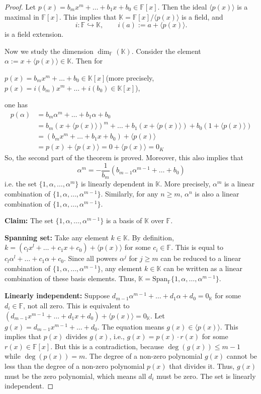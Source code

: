 \begin{proof}
Let $p(x) = b_mx^m + \dots + b_1 x + b_0 \in \mathbb{F}[x]$. Then the ideal $\langle p(x) \rangle$ is a maximal in $\mathbb{F}[x]$.
This implies that $\mathbb{K} = \mathbb{F}[x]/\langle p(x) \rangle$ is a field, and
$$i: \mathbb{F} \hookrightarrow \mathbb{K}, \quad \quad i(a) := a + \langle p(x) \rangle.$$
is a field extension.

Now we study the dimension $\dim_{\mathbb{F}}(\mathbb{K})$. Consider the element $\alpha := x + \langle p(x) \rangle \in \mathbb{K}$. Then for 
\begin{center}
$p(x) = b_m x^m + \dots  + b_0 \in \mathbb{K}[x]$\quad (more precisely, $p(x) = i(b_m) x^m + \dots + i(b_0) \in \mathbb{K}[x]$),
\end{center}
one has
\begin{align*}
p(\alpha) &= b_m \alpha^m + \dots + b_1 \alpha + b_0 \\
&= b_m(x+\langle p(x) \rangle)^m + \dots + b_1(x+\langle p(x) \rangle) + b_0(1+\langle p(x) \rangle) \\
&= (b_m x^m + \dots + b_1 x + b_0) + \langle p(x) \rangle \\
&= p(x) + \langle p(x) \rangle = 0 + \langle p(x) \rangle = 0_K
\end{align*}
So, the second part of the theorem is proved. Moreover, this also implies that 
\[\alpha^m = -\frac{1}{b_m}(b_{m-1}\alpha^{m-1} + \dots + b_0)\] 
i.e. the set $\{1, \alpha, \dots, \alpha^m\}$ is linearly dependent in $\mathbb{K}$. More precisely, $\alpha^m$ is a linear combination of $\{1, \alpha, \dots, \alpha^{m-1}\}$.
Similarly, for any $n \ge m$, $\alpha^n$ is also a linear combination of $\{1, \alpha, \dots, \alpha^{m-1}\}$.

\textbf{Claim:} The set $\{1, \alpha, \dots, \alpha^{m-1}\}$ is a basis of $\mathbb{K}$ over $\mathbb{F}$.

\textbf{Spanning set:} Take any element $k \in \mathbb{K}$. By definition, $k = (c_l x^l + \dots + c_1 x + c_0) + \langle p(x) \rangle$ for some $c_i \in \mathbb{F}$.
This is equal to $c_l \alpha^l + \dots + c_1 \alpha + c_0$.
Since all powers $\alpha^j$ for $j \ge m$ can be reduced to a linear combination of $\{1, \alpha, \dots, \alpha^{m-1}\}$, any element $k \in \mathbb{K}$ can be written as a linear combination of these basis elements.
Thus, $\mathbb{K} = \text{Span}_{\mathbb{F}}\{1, \alpha, \dots, \alpha^{m-1}\}$.

\textbf{Linearly independent:} Suppose $d_{m-1}\alpha^{m-1} + \dots + d_1\alpha + d_0 = 0_{\mathbb{K}}$ for some $d_i \in \mathbb{F}$, not all zero.
This is equivalent to $(d_{m-1}x^{m-1} + \dots + d_1x + d_0) + \langle p(x) \rangle = 0_{\mathbb{K}}$.
Let $g(x) = d_{m-1}x^{m-1} + \dots + d_0$.
The equation means $g(x) \in \langle p(x) \rangle$.
This implies that $p(x)$ divides $g(x)$, i.e., $g(x) = p(x) \cdot r(x)$ for some $r(x) \in \mathbb{F}[x]$.
But this is a contradiction, because $\deg(g(x)) \le m-1$ while $\deg(p(x)) = m$. The degree of a non-zero polynomial $g(x)$ cannot be less than the degree of a non-zero polynomial $p(x)$ that divides it. Thus, $g(x)$ must be the zero polynomial, which means all $d_i$ must be zero.
The set is linearly independent.


\end{proof}
